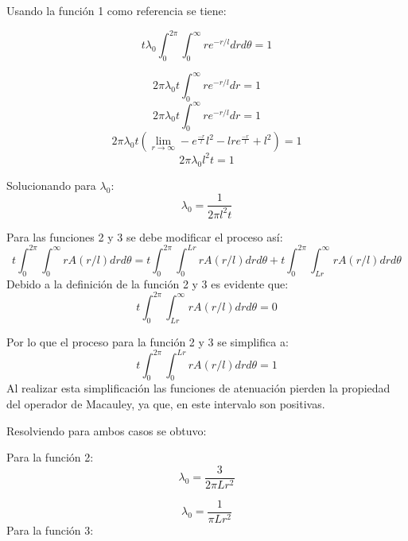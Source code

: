 Usando la función 1 como referencia se tiene:

\begin{equation}
	t\lambda_0\int_{0}^{2\pi}\int_{0}^{\infty}{re^{-r/l}}{dr}{d\theta}=1
\end{equation} 

\begin{equation}
	2\pi\lambda_0t\int_{0}^{\infty}{re^{-r/l}}{dr}=1
\end{equation}
\begin{equation}
	2\pi\lambda_0t\int_{0}^{\infty}{re^{-r/l}}{dr}=1
\end{equation} 
\begin{equation}
	2\pi\lambda_0t\left(\lim_{r\to\infty}-e^{\frac{-r}{l}}l^2-lre^{\frac{-r}{l}}+l^2\right)=1
\end{equation} 
\begin{equation}
	2\pi\lambda_0l^2t=1
\end{equation} 

Solucionando para $\lambda_0$:
\begin{equation}
	\lambda_0=\frac{1}{2\pi l^2 t}
\end{equation} 

Para las funciones 2 y 3 se debe modificar el proceso así:
\begin{equation}
	t\int_{0}^{2\pi}\int_{0}^{\infty}{rA(r/l)}{dr}{d\theta}=t\int_{0}^{2\pi}\int_{0}^{Lr}{rA(r/l)}{dr}{d\theta}+t\int_{0}^{2\pi}\int_{Lr}^{\infty}{rA(r/l)}{dr}{d\theta}
\end{equation}
Debido a la definición de la función 2 y 3 es evidente que:
\begin{equation}
	t\int_{0}^{2\pi}\int_{Lr}^{\infty}{rA(r/l)}{dr}{d\theta}=0
\end{equation}

Por lo que el proceso para la función 2 y 3 se simplifica a:
\begin{equation}
	t\int_{0}^{2\pi}\int_{0}^{Lr}{rA(r/l)}{dr}{d\theta}=1
\end{equation}
Al realizar esta simplificación las funciones de atenuación pierden la propiedad del operador de Macauley, ya que, en este intervalo son positivas.

Resolviendo para ambos casos se obtuvo:

Para la función 2:
\begin{equation}
	\lambda_0=\frac{3}{2\pi Lr^2}
\end{equation}

\begin{equation}
	\lambda_0=\frac{1}{\pi Lr^2}
\end{equation}
Para la función 3:

